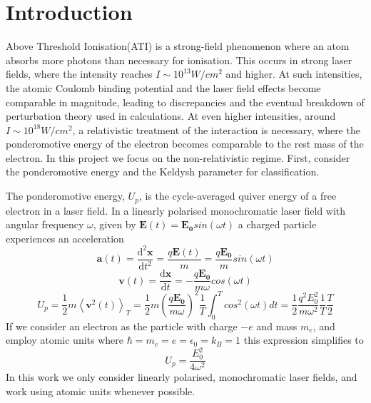 \documentclass[11pt]{article}
\numberwithin{equation}{section}
\begin{document}
\tableofcontents
\newpage

\section{Introduction}

Above Threshold Ionisation(ATI) is a strong-field phenomenon where an atom absorbs more photons than necessary for ionisation. This occurs in strong laser fields, where the intensity reaches $I \sim 10^{13} W/cm^2$ and higher. At such intensities, the atomic Coulomb binding potential and the laser field effects become comparable in magnitude, leading to discrepancies and the eventual breakdown of perturbation theory used in calculations. At even higher intensities, around $I \sim 10^{18} W/cm^2$, a relativistic treatment of the interaction is necessary, where the ponderomotive energy of the electron becomes comparable to the rest mass of the electron. In this project we focus on the non-relativistic regime. First, consider the ponderomotive energy and the Keldysh parameter for classification.
\par
The ponderomotive energy, $U_p$, is the cycle-averaged quiver energy of a free electron in a laser field. In a linearly polarised monochromatic laser field with angular frequency $\omega$, given by $\mathbf{E}(t) = \mathbf{E_0} sin(\omega t)$ a charged particle experiences an acceleration 
\begin{equation}
    \mathbf{a}(t) = \frac{\mathrm{d}^2 \mathbf{x}}{\mathrm{d} t^2} = \frac{q\mathbf{E}(t)}{m} = \frac{q\mathbf{E_0}}{m} sin(\omega t)
\end{equation}
\begin{equation}
    \mathbf{v}(t) = \frac{\mathrm{d} \mathbf{x}}{\mathrm{d} t} = -\frac{q\mathbf{E_0}}{m\omega} cos(\omega t)
\end{equation}
\begin{equation}
    U_p = \frac{1}{2}m \left\langle \mathbf{v}^2(t) \right\rangle_T = \frac{1}{2} m \left( \frac{q\mathbf{E_0}}{m\omega}\right)^2 \frac{1}{T} \int_0^T cos^2(\omega t) dt =\frac{1}{2} \frac{q^2 E_0^2}{ m \omega^2 }\frac{1}{T}\frac{T}{2}
\end{equation}
If we consider an electron as the particle with charge $-e$ and mass $m_e$, and employ atomic units where $\hbar = m_e = e = \epsilon_0 = k_B = 1$ this expression simplifies to
\begin{equation}
    U_p = \frac{E_0^2}{4\omega^2}
\end{equation}
In this work we only consider linearly polarised, monochromatic laser fields, and work using atomic units whenever possible.
\end{document}
